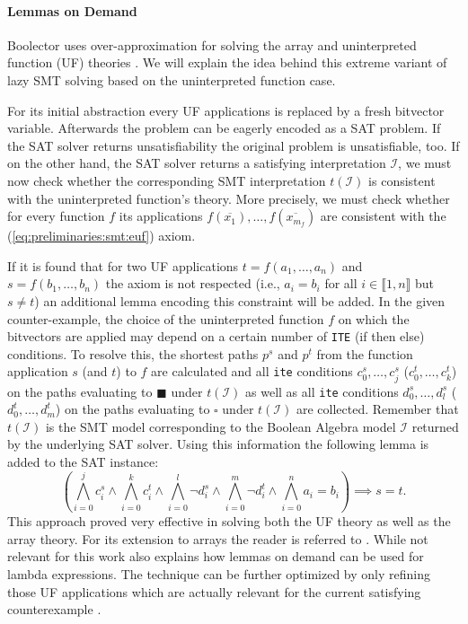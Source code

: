 \paragraph{Lemmas on Demand}
Boolector uses over-approximation for solving the array \cite{p6-brummayer} and uninterpreted function (UF) theories \cite{PreinerNiemetzBiere-DIFTS13}. We will explain the idea behind this extreme variant of lazy SMT solving based on the uninterpreted function case.
\par
For its initial abstraction every UF applications is replaced by a fresh bitvector variable. Afterwards the problem can be eagerly encoded as a SAT problem. If the SAT solver returns unsatisfiability the original problem is unsatisfiable, too. If on the other hand, the SAT solver returns a satisfying interpretation $\mathcal{I}$, we must now check whether the corresponding SMT interpretation $t\left(\mathcal{I}\right)$ is consistent with the uninterpreted function's theory. More precisely, we must check whether for every function $f$ its applications $f\left(\overline{x_1}\right),\dots,f\left(\overline{x_{m_{f}}}\right)$ are consistent with the (\ref{eq:preliminaries:smt:euf}) axiom.
\par
If it is found that for two UF applications $t=f\left(a_1,\dots,a_n\right)$ and $s=f\left(b_1,\dots,b_n\right)$
the axiom is not respected (i.e., $a_i=b_i$ for all $i\in\llbracket1,n\rrbracket$ but $s\neq t$) an additional lemma encoding this constraint will be added. In the given counter-example, the choice of the uninterpreted function $f$ on which the bitvectors are applied may depend on a certain number of \texttt{ITE} (if then else) conditions. To resolve this, the shortest paths $p^s$ and $p^t$ from the function application $s$ (and $t$) to $f$ are calculated and all \texttt{ite} conditions $c_0^s,\dots,c_j^s$ ($c_0^t,\dots,c_k^t$) on the paths evaluating to $\blacksquare$ under $t\left(\mathcal{I}\right)$ as well as all \texttt{ite} conditions $d_0^s,\dots,d_l^s$ ($d_0^t,\dots,d_m^t$) on the paths evaluating to $\square$ under $t\left(\mathcal{I}\right)$ are collected. Remember that $t\left(\mathcal{I}\right)$ is the SMT model corresponding to the Boolean Algebra model $\mathcal{I}$ returned by the underlying SAT solver. Using this information the following lemma is added to the SAT instance:
\[
\left(\bigwedge\limits_{i=0}^{j}c_i^s \land \bigwedge\limits_{i=0}^{k}c_i^t \land \bigwedge\limits_{i=0}^{l} \neg d_i^s \land \bigwedge\limits_{i=0}^{m} \neg d_i^t \land \bigwedge\limits_{i=0}^{n} a_i=b_i \right) \implies s=t.
\]
This approach proved very effective in solving both the UF theory as well as the array theory.
For its extension to arrays the reader is referred to \cite{p6-brummayer}.
While not relevant for this work \cite{PreinerNiemetzBiere-DIFTS13} also explains how lemmas on demand can be used for lambda expressions.
The technique can be further optimized by only refining those UF applications which are actually relevant for the current satisfying counterexample \cite{NiemetzPreinerBiere-FMCAD14}.

